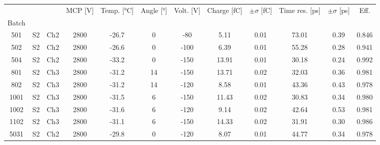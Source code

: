\begin{tabular}{cccccccccccc}
\toprule
 &  &  & MCP [V] & Temp. [°C] & Angle [°] & Volt. [V] & Charge [fC] & \(\pm\sigma\) [fC] & Time res. [ps] & \(\pm\sigma\) [ps] & Eff. \\
Batch &  &  &  &  &  &  &  &  &  &  &  \\
\midrule
501 & S2 & Ch2 & 2800 & -26.7 & 0 & -80 & 5.11 & 0.01 & 73.01 & 0.39 & 0.846 \\
502 & S2 & Ch2 & 2800 & -26.6 & 0 & -100 & 6.39 & 0.01 & 55.28 & 0.28 & 0.941 \\
504 & S2 & Ch2 & 2800 & -33.2 & 0 & -150 & 13.91 & 0.01 & 30.18 & 0.24 & 0.992 \\
801 & S2 & Ch3 & 2800 & -31.2 & 14 & -150 & 13.71 & 0.02 & 32.03 & 0.36 & 0.981 \\
802 & S2 & Ch3 & 2800 & -31.2 & 14 & -120 & 8.58 & 0.01 & 43.36 & 0.43 & 0.978 \\
1001 & S2 & Ch3 & 2800 & -31.5 & 6 & -150 & 11.43 & 0.02 & 30.83 & 0.34 & 0.980 \\
1002 & S2 & Ch3 & 2800 & -31.6 & 6 & -120 & 9.14 & 0.02 & 42.64 & 0.53 & 0.981 \\
1102 & S2 & Ch3 & 2800 & -31.1 & 6 & -150 & 14.33 & 0.02 & 31.91 & 0.30 & 0.986 \\
5031 & S2 & Ch2 & 2800 & -29.8 & 0 & -120 & 8.07 & 0.01 & 44.77 & 0.34 & 0.978 \\
\bottomrule
\end{tabular}
